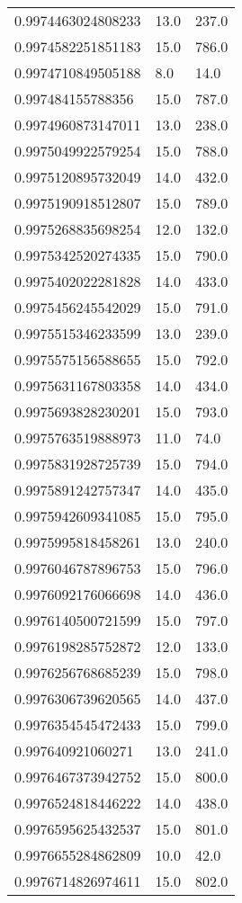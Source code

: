 \begin{center}
\begin{supertabular}[H]{p{0.30\textwidth}p{0.05\textwidth}p{0.05\textwidth}}
0.9974463024808233 & 13.0 & 237.0 \\ 
0.9974582251851183 & 15.0 & 786.0 \\ 
0.9974710849505188 & 8.0 & 14.0 \\ 
0.997484155788356 & 15.0 & 787.0 \\ 
0.9974960873147011 & 13.0 & 238.0 \\ 
0.9975049922579254 & 15.0 & 788.0 \\ 
0.9975120895732049 & 14.0 & 432.0 \\ 
0.9975190918512807 & 15.0 & 789.0 \\ 
0.9975268835698254 & 12.0 & 132.0 \\ 
0.9975342520274335 & 15.0 & 790.0 \\ 
0.9975402022281828 & 14.0 & 433.0 \\ 
0.9975456245542029 & 15.0 & 791.0 \\ 
0.9975515346233599 & 13.0 & 239.0 \\ 
0.9975575156588655 & 15.0 & 792.0 \\ 
0.9975631167803358 & 14.0 & 434.0 \\ 
0.9975693828230201 & 15.0 & 793.0 \\ 
0.9975763519888973 & 11.0 & 74.0 \\ 
0.9975831928725739 & 15.0 & 794.0 \\ 
0.9975891242757347 & 14.0 & 435.0 \\ 
0.9975942609341085 & 15.0 & 795.0 \\ 
0.9975995818458261 & 13.0 & 240.0 \\ 
0.9976046787896753 & 15.0 & 796.0 \\ 
0.9976092176066698 & 14.0 & 436.0 \\ 
0.9976140500721599 & 15.0 & 797.0 \\ 
0.9976198285752872 & 12.0 & 133.0 \\ 
0.9976256768685239 & 15.0 & 798.0 \\ 
0.9976306739620565 & 14.0 & 437.0 \\ 
0.9976354545472433 & 15.0 & 799.0 \\ 
0.997640921060271 & 13.0 & 241.0 \\ 
0.9976467373942752 & 15.0 & 800.0 \\ 
0.9976524818446222 & 14.0 & 438.0 \\ 
0.9976595625432537 & 15.0 & 801.0 \\ 
0.9976655284862809 & 10.0 & 42.0 \\ 
0.9976714826974611 & 15.0 & 802.0 \\ 

\end{supertabular}
\end{center}
